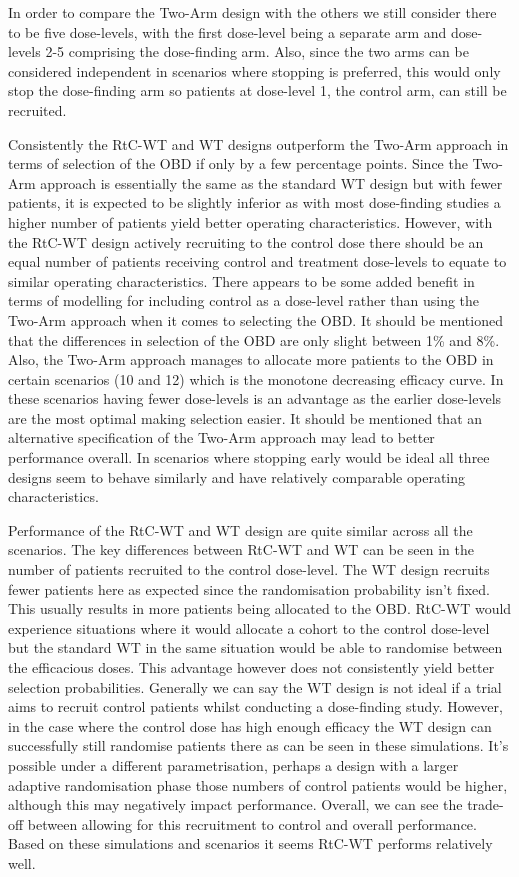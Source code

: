 In order to compare the Two-Arm design with the others we still consider there to be five dose-levels, with the first dose-level being a separate arm and dose-levels 2-5 comprising the dose-finding arm. Also, since the two arms can be considered independent in scenarios where stopping is preferred, this would only stop the dose-finding arm so patients at dose-level 1, the control arm, can still be recruited.   

Consistently the RtC-WT and WT designs outperform the Two-Arm approach in terms of selection of the OBD if only by a few percentage points. Since the Two-Arm approach is essentially the same as the standard WT design but with fewer patients, it is expected to be slightly inferior as with most dose-finding studies a higher number of patients yield better operating characteristics. However, with the RtC-WT design actively recruiting to the control dose there should be an equal number of patients receiving control and treatment dose-levels to equate to similar operating characteristics. There appears to be some added benefit in terms of modelling for including control as a dose-level rather than using the Two-Arm approach when it comes to selecting the OBD. It should be mentioned that the differences in selection of the OBD are only slight between 1\% and 8\%. Also, the Two-Arm approach manages to allocate more patients to the OBD in certain scenarios (10 and 12) which is the monotone decreasing efficacy curve. In these scenarios having fewer dose-levels is an advantage as the earlier dose-levels are the most optimal making selection easier. It should be mentioned that an alternative specification of the Two-Arm approach may lead to better performance overall. In scenarios where stopping early would be ideal all three designs seem to behave similarly and have relatively comparable operating characteristics. 

Performance of the RtC-WT and WT design are quite similar across all the scenarios. The key differences between RtC-WT and WT can be seen in the number of patients recruited to the control dose-level. The WT design recruits fewer patients here as expected since the randomisation probability isn't fixed. This usually results in more patients being allocated to the OBD. RtC-WT would experience situations where it would allocate a cohort to the control dose-level but the standard WT in the same situation would be able to randomise between the efficacious doses. This advantage however does not consistently yield better selection probabilities. Generally we can say the WT design is not ideal if a trial aims to recruit control patients whilst conducting a dose-finding study. However, in the case where the control dose has high enough efficacy the WT design can successfully still randomise patients there as can be seen in these simulations. It's possible under a different parametrisation, perhaps a design with a larger adaptive randomisation phase those numbers of control patients would be higher, although this may negatively impact performance. Overall, we can see the trade-off between allowing for this recruitment to control and overall performance. Based on these simulations and scenarios it seems RtC-WT performs relatively well.

